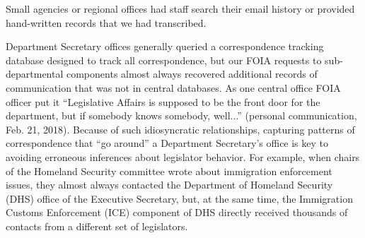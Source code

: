 Small agencies or regional offices had staff search their email history or provided hand-written records that we had transcribed. 

Department Secretary offices generally queried a correspondence tracking database designed to track all correspondence, but our FOIA requests to sub-departmental components almost always recovered additional records of communication that was not in central databases. 
As one central office FOIA officer put it ``Legislative Affairs is supposed to be the front door for the department, but if somebody knows somebody, well...'' (personal communication, Feb. 21, 2018). 
Because of such idiosyncratic relationships, capturing patterns of correspondence that ``go around'' a Department Secretary's office is key to avoiding erroneous inferences about legislator behavior. 
For example, when chairs of the Homeland Security committee wrote about immigration enforcement issues, they almost always contacted the Department of Homeland Security (DHS) office of the Executive Secretary, but, at the same time, the Immigration Customs Enforcement (ICE) component of DHS directly received thousands of contacts from a different set of legislators. 

